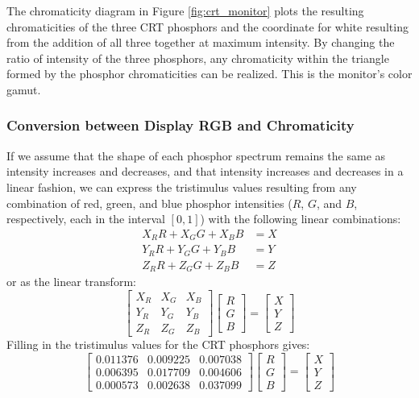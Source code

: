 \documentclass[twocolumn]{article}
\begin{document}
The chromaticity diagram in Figure \ref{fig:crt_monitor} plots the resulting chromaticities of the three CRT phosphors and the coordinate for white resulting from the addition of all three together at maximum intensity.  By changing the ratio of intensity of the three phosphors, any chromaticity within the triangle formed by the phosphor chromaticities can be realized.  This is the monitor's color gamut.
\subsubsection{Conversion between Display RGB and Chromaticity}
If we assume that the shape of each phosphor spectrum remains the same as intensity increases and decreases, and that intensity increases and decreases in a linear fashion, we can express the tristimulus values resulting from any combination of red, green, and blue phosphor intensities ($R$, $G$, and $B$, respectively, each in the interval $[0,1]$) with the following linear combinations:
\begin{equation}
    \begin{aligned}
        X_RR+X_GG+X_BB&=X\\
        Y_RR+Y_GG+Y_BB&=Y\\
        Z_RR+Z_GG+Z_BB&=Z
    \end{aligned}
\end{equation}
or as the linear transform:
\begin{equation}
    \begin{bmatrix}
        X_R&X_G&X_B\\
        Y_R&Y_G&Y_B\\
        Z_R&Z_G&Z_B
    \end{bmatrix}\begin{bmatrix}
        R\\
        G\\
        B
    \end{bmatrix}=\begin{bmatrix}
        X\\
        Y\\
        Z
    \end{bmatrix}
\end{equation}
Filling in the tristimulus values for the CRT phosphors gives:
\begin{equation}\label{eq:crt_transformation}
    \begin{bmatrix}
        0.011376&0.009225&0.007038\\
        0.006395&0.017709&0.004606\\
        0.000573&0.002638&0.037099
    \end{bmatrix}\begin{bmatrix}
        R\\
        G\\
        B
    \end{bmatrix}=\begin{bmatrix}
        X\\
        Y\\
        Z
    \end{bmatrix}
\end{equation}
\end{document}
